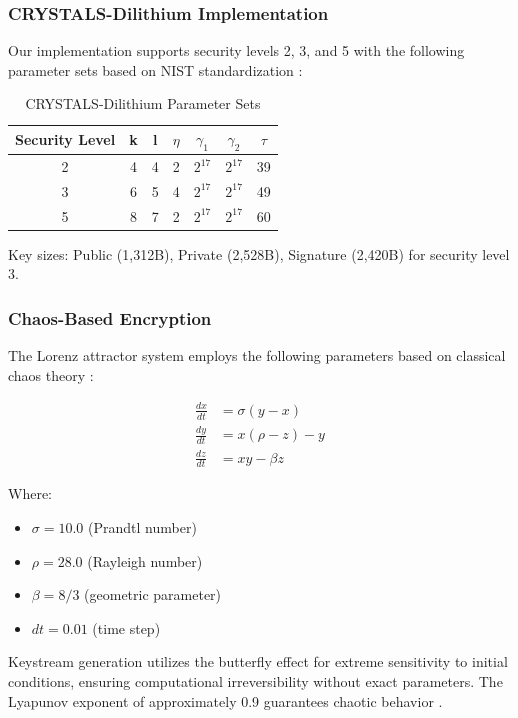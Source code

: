 \documentclass[12pt,a4paper]{article}
\begin{document}
\subsubsection{CRYSTALS-Dilithium Implementation}

Our implementation supports security levels 2, 3, and 5 with the following parameter sets based on NIST standardization \cite{nist2022fips204}:

\begin{table}[H]
\centering
\caption{CRYSTALS-Dilithium Parameter Sets}
\begin{tabular}{@{}ccccccc@{}}
\toprule
Security Level & k & l & $\eta$ & $\gamma_1$ & $\gamma_2$ & $\tau$ \\
\midrule
2 & 4 & 4 & 2 & $2^{17}$ & $2^{17}$ & 39 \\
3 & 6 & 5 & 4 & $2^{17}$ & $2^{17}$ & 49 \\
5 & 8 & 7 & 2 & $2^{17}$ & $2^{17}$ & 60 \\
\bottomrule
\end{tabular}
\label{tab:dilithium_params}
\end{table}

Key sizes: Public (1,312B), Private (2,528B), Signature (2,420B) for security level 3.

\subsubsection{Chaos-Based Encryption}

The Lorenz attractor system employs the following parameters based on classical chaos theory \cite{lorenz1963deterministic}:

\begin{align}
\frac{dx}{dt} &= \sigma(y - x) \\
\frac{dy}{dt} &= x(\rho - z) - y \\
\frac{dz}{dt} &= xy - \beta z
\end{align}

Where:
\begin{itemize}
    \item $\sigma = 10.0$ (Prandtl number)
    \item $\rho = 28.0$ (Rayleigh number)  
    \item $\beta = 8/3$ (geometric parameter)
    \item $dt = 0.01$ (time step)
\end{itemize}

Keystream generation utilizes the butterfly effect for extreme sensitivity to initial conditions, ensuring computational irreversibility without exact parameters. The Lyapunov exponent of approximately 0.9 guarantees chaotic behavior \cite{wolf1985determining}.
\end{document}
